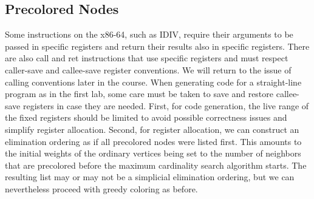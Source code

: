 \subsection{ Precolored Nodes}
Some instructions on the x86-64, such as IDIV, require their arguments to
be passed in specific registers and return their results also in specific registers. There are also call and ret instructions that use specific registers
and must respect caller-save and callee-save register conventions. We will
return to the issue of calling conventions later in the course. When generating code for a straight-line program as in the first lab, some care must be
taken to save and restore callee-save registers in case they are needed.
First, for code generation, the live range of the fixed registers should be
limited to avoid possible correctness issues and simplify register allocation.
Second, for register allocation, we can construct an elimination ordering as if all precolored nodes were listed first. This amounts to the initial weights of the ordinary vertices being set to the number of neighbors
that are precolored before the maximum cardinality search algorithm starts.
The resulting list may or may not be a simplicial elimination ordering, but
we can nevertheless proceed with greedy coloring as before.

